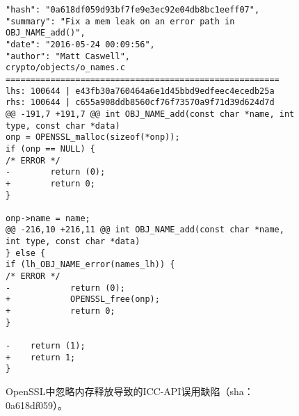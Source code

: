 \begin{figure}[b]
	\centering
\begin{lstlisting}
"hash": "0a618df059d93bf7fe9e3ec92e04db8bc1eeff07",
"summary": "Fix a mem leak on an error path in OBJ_NAME_add()",
"date": "2016-05-24 00:09:56",
"author": "Matt Caswell",
crypto/objects/o_names.c
=======================================================
lhs: 100644 | e43fb30a760464a6e1d45bbd9edfeec4ecedb25a
rhs: 100644 | c655a908ddb8560cf76f73570a9f71d39d624d7d
@@ -191,7 +191,7 @@ int OBJ_NAME_add(const char *name, int type, const char *data)
onp = OPENSSL_malloc(sizeof(*onp));
if (onp == NULL) {
/* ERROR */
-        return (0);
+        return 0;
}

onp->name = name;
@@ -216,10 +216,11 @@ int OBJ_NAME_add(const char *name, int type, const char *data)
} else {
if (lh_OBJ_NAME_error(names_lh)) {
/* ERROR */
-            return (0);
+            OPENSSL_free(onp);
+            return 0;
}

-    return (1);
+    return 1;
}

\end{lstlisting}
	\caption{
	OpenSSL中忽略内存释放导致的ICC-API误用缺陷（sha：0a618df059）。
	}
	\label{fig:2-3-icc-1}
\end{figure}